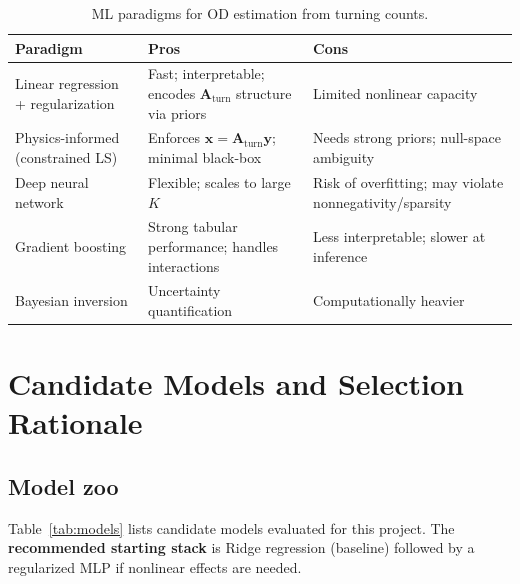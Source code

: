 \documentclass[11pt,a4paper]{report}
\newcommand{\mathbfy}{\mathbf{y}}
\newcommand{\mathbfx}{\mathbf{x}}
\newcommand{\Aturn}{\mathbf{A}_{\mathrm{turn}}}
\begin{document}
\begin{table}[ht]
\centering
\caption{ML paradigms for OD estimation from turning counts.}
\label{tab:paradigms}
\small
\begin{tabular}{@{}p{3.5cm}p{4.5cm}p{4.5cm}@{}}
\toprule
\textbf{Paradigm} & \textbf{Pros} & \textbf{Cons} \\
\midrule
Linear regression + regularization &
Fast; interpretable; encodes $\Aturn$ structure via priors &
Limited nonlinear capacity \\
Physics-informed (constrained LS) &
Enforces $\mathbfx=\Aturn\mathbfy$; minimal black-box &
Needs strong priors; null-space ambiguity \\
Deep neural network &
Flexible; scales to large $K$ &
Risk of overfitting; may violate nonnegativity/sparsity \\
Gradient boosting &
Strong tabular performance; handles interactions &
Less interpretable; slower at inference \\
Bayesian inversion &
Uncertainty quantification &
Computationally heavier \\
\bottomrule
\end{tabular}
\end{table}


\chapter{Candidate Models and Selection Rationale}
\label{ch:models}

\section{Model zoo}

Table~\ref{tab:models} lists candidate models evaluated for this project. The \textbf{recommended starting stack} is Ridge regression (baseline) followed by a regularized MLP if nonlinear effects are needed.
\end{document}
